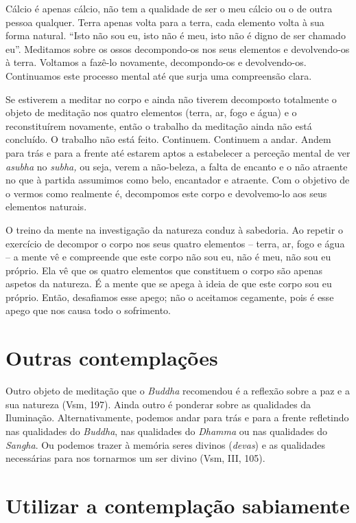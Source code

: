 Cálcio é apenas cálcio, não tem a qualidade de ser o meu cálcio ou o de
outra pessoa qualquer. Terra apenas volta para a terra, cada elemento
volta à sua forma natural. ``Isto não sou eu, isto não é meu, isto não é
digno de ser chamado eu''. Meditamos sobre os ossos decompondo-os nos
seus elementos e devolvendo-os à terra. Voltamos a fazê-lo novamente,
decompondo-os e devolvendo-os. Continuamos este processo mental até que
surja uma compreensão clara.

Se estiverem a meditar no corpo e ainda não tiverem decomposto
totalmente o objeto de meditação nos quatro elementos (terra, ar, fogo e
água) e o reconstituírem novamente, então o trabalho da meditação ainda
não está concluído. O trabalho não está feito. Continuem. Continuem a
andar. Andem para trás e para a frente até estarem aptos a estabelecer a
perceção mental de ver \emph{asubha} no \emph{subha,} ou seja, verem a
não-beleza, a falta de encanto e o não atraente no que à partida
assumimos como belo, encantador e atraente. Com o objetivo de o vermos
como realmente é, decompomos este corpo e devolvemo-lo aos seus
elementos naturais.

O treino da mente na investigação da natureza conduz à sabedoria. Ao
repetir o exercício de decompor o corpo nos seus quatro elementos --
terra, ar, fogo e água -- a mente vê e compreende que este corpo não sou
eu, não é meu, não sou eu próprio. Ela vê que os quatro elementos que
constituem o corpo são apenas aspetos da natureza. É a mente que se
apega à ideia de que este corpo sou eu próprio. Então, desafiamos esse
apego; não o aceitamos cegamente, pois é esse apego que nos causa todo o
sofrimento.

\section{Outras contemplações}

Outro objeto de meditação que o \emph{Buddha} recomendou é a reflexão
sobre a paz e a sua natureza (Vsm, 197). Ainda outro é ponderar sobre as
qualidades da Iluminação. Alternativamente, podemos andar para trás e
para a frente refletindo nas qualidades do \emph{Buddha}, nas qualidades
do \emph{Dhamma} ou nas qualidades do \emph{Sangha}. Ou podemos trazer à
memória seres divinos (\emph{devas}) e as qualidades necessárias para
nos tornarmos um ser divino (Vsm, III, 105).

\section{Utilizar a contemplação sabiamente}


